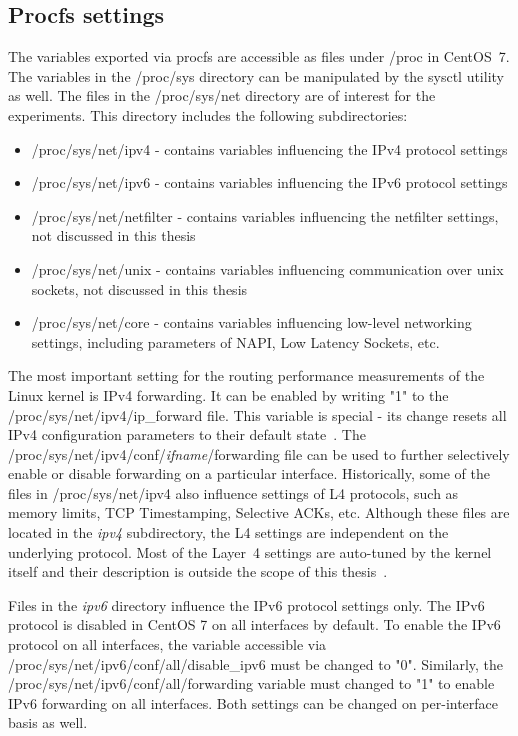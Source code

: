 
\subsection{Procfs settings}\label{subsec:analysis-settings-procfs}
The variables exported via procfs are accessible as files under /proc in CentOS~7.
The variables in the /proc/sys directory can be manipulated by the sysctl utility as well.
The files in the /proc/sys/net directory are of interest for the experiments.
This directory includes the following subdirectories:
\begin{itemize}
\item /proc/sys/net/ipv4 - contains variables influencing the IPv4 protocol settings
\item /proc/sys/net/ipv6 - contains variables influencing the IPv6 protocol settings
\item /proc/sys/net/netfilter - contains variables influencing the netfilter settings, not discussed in this thesis
\item /proc/sys/net/unix - contains variables influencing communication over unix sockets, not discussed in this thesis
\item /proc/sys/net/core - contains variables influencing low-level networking settings, including parameters of NAPI, Low Latency Sockets, etc.
\end{itemize}

The most important setting for the routing performance measurements of the Linux kernel is IPv4 forwarding.
It can be enabled by writing "1" to the /proc/sys/net/ipv4/ip\_forward file.
This variable is special - its change resets all IPv4 configuration parameters to their default state~\cite{kernel-doc-ip-sysctl}.
The /proc/sys/net/ipv4/conf/{\it{ifname}}/forwarding file can be used
to further selectively enable or disable forwarding on a particular interface.
Historically, some of the files in /proc/sys/net/ipv4 also influence settings of L4 protocols,
such as memory limits, TCP Timestamping, Selective ACKs, etc.
Although these files are located in the {\it{ipv4}} subdirectory, the L4 settings are independent on the underlying protocol.
Most of the Layer~4 settings are auto-tuned by the kernel itself and
their description is outside the scope of this thesis~\cite{linux-kernel-networking}.

Files in the {\it{ipv6}} directory influence the IPv6 protocol settings only.
The IPv6 protocol is disabled in CentOS 7 on all interfaces by default.
To enable the IPv6 protocol on all interfaces,
the variable accessible via /proc/sys/net/ipv6/conf/all/disable\_ipv6 must be changed to "0".
Similarly, the /proc/sys/net/ipv6/conf/all/forwarding variable must changed to "1" to enable IPv6 forwarding on all interfaces.
Both settings can be changed on per-interface basis as well.

